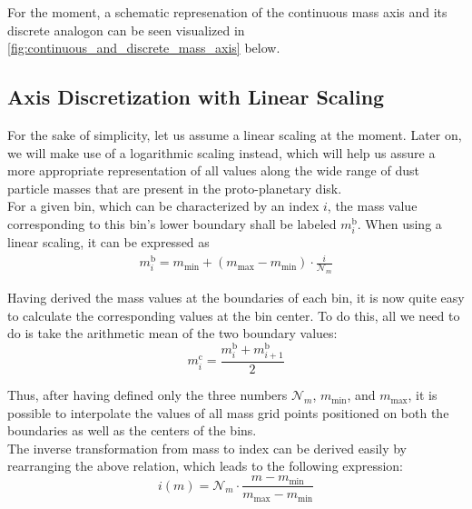     For the moment, a schematic represenation of the continuous mass axis and its discrete analogon
    can be seen visualized in \cref{fig:continuous_and_discrete_mass_axis} below.

    

    \subsection{Axis Discretization with Linear Scaling}
    \label{subsec:axis_discretization_with_linear_scale}

        For the sake of simplicity, let us assume a linear scaling at the moment. Later on, we 
        will make use of a logarithmic scaling instead, which will help us assure a more 
        appropriate representation of all values along the wide range of dust particle masses 
        that are present in the proto-planetary disk. \\
    
        For a given bin, which can be characterized by an index $i$, the mass value corresponding 
        to this bin's lower boundary shall be labeled $m_i^\text{b}$. When using a linear scaling,
        it can be expressed as
        \begin{align}
          m_i^\text{b}=m_\text{min}+(m_\text{max}-m_\text{min})\cdot\frac{i}{\mathcal N_m}
        \end{align}

        Having derived the mass values at the boundaries of each bin, it is now quite easy to 
        calculate the corresponding values at the bin center. To do this, all we need to do is take 
        the arithmetic mean of the two boundary values:
        \begin{equation}
            m_i^\text{c}
                =\frac{m_i^\text{b}+m_{i+1}^\text{b}}{2}
        \end{equation}
        
        Thus, after having defined only the three numbers $\mathcal N_m$, $m_\text{min}$, and 
        $m_\text{max}$, it is possible to interpolate the values of all mass grid points positioned 
        on both the boundaries as well as the  centers of the bins. \\
        
        The inverse transformation from mass to index can be derived easily by rearranging the 
        above relation, which leads to the following expression:
        \begin{equation}
            i(m)
                =\mathcal N_m\cdot\frac{m-m_\text{min}}{m_\text{max}-m_\text{min}}
        \end{equation}
        
